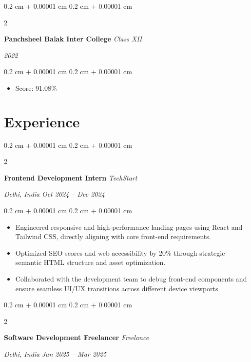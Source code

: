 \documentclass[10pt, a4paper]{article}
\newenvironment{highlights}{
    \begin{itemize}[
        topsep=0.10 cm,
        parsep=0.10 cm,
        partopsep=0pt,
        itemsep=0pt,
        leftmargin=0.4 cm + 10pt
    ]
}{
    \end{itemize}
} %
\newenvironment{onecolentry}{
    \begin{adjustwidth}{
        0.2 cm + 0.00001 cm
    }{
        0.2 cm + 0.00001 cm
    }
}{
    \end{adjustwidth}
} %
\newenvironment{twocolentry}[2][]{
    \onecolentry
    \def\secondColumn{#2}
    \setcolumnwidth{\fill, 4.5 cm}
    \begin{paracol}{2}
}{
    \switchcolumn \raggedleft \secondColumn
    \end{paracol}
    \endonecolentry
} %
\begin{document}
    \begin{twocolentry}{
        \textit{2022}
    }
    \textbf{Panchsheel Balak Inter College}
    \textit{Class XII}
    \end{twocolentry}
    \vspace{0.10 cm}
    \begin{onecolentry}
    \begin{highlights}
        \item Score: 91.08\%
    \end{highlights}
    \end{onecolentry}
    

    \section{Experience}

        \begin{twocolentry}{
            \textit{Delhi, India}    
            \textit{Oct 2024 -- Dec 2024}
        }
        \textbf{Frontend Development Intern}
        \textit{TechStart}
        \end{twocolentry}

        \vspace{0.10 cm}
        \begin{onecolentry}
        \begin{highlights}
            \item Engineered responsive and high-performance landing pages using React and Tailwind CSS, directly aligning with core front-end requirements.
\item Optimized SEO scores and web accessibility by 20\% through strategic semantic HTML structure and asset optimization.
\item Collaborated with the development team to debug front-end components and ensure seamless UI/UX transitions across different device viewports.
        \end{highlights}
        \end{onecolentry}
        \vspace{0.2 cm}
        

        \begin{twocolentry}{
            \textit{Delhi, India}    
            \textit{Jan 2025 -- Mar 2025}
        }
        \textbf{Software Development Freelancer}
        \textit{Freelance}
        \end{twocolentry}
\end{document}
